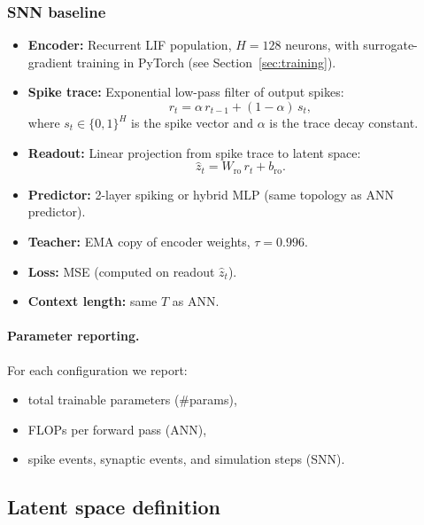 \documentclass[11pt,a4paper]{article}
\begin{document}
\subsubsection{SNN baseline}

\begin{itemize}[nosep]
\item \textbf{Encoder:} Recurrent LIF population, $H=128$ neurons,
  with surrogate-gradient training in PyTorch (see
  Section~\ref{sec:training}).
\item \textbf{Spike trace:} Exponential low-pass filter of output spikes:
  \begin{equation}\label{eq:spike-trace}
    r_t = \alpha\, r_{t-1} + (1-\alpha)\, s_t,
  \end{equation}
  where $s_t\in\{0,1\}^H$ is the spike vector and $\alpha$ is the
  trace decay constant.
\item \textbf{Readout:} Linear projection from spike trace to latent
  space:
  \begin{equation}\label{eq:readout}
    \hat{z}_t = W_{\text{ro}}\, r_t + b_{\text{ro}}.
  \end{equation}
\item \textbf{Predictor:} 2-layer spiking or hybrid MLP (same topology
  as ANN predictor).
\item \textbf{Teacher:} EMA copy of encoder weights, $\tau=0.996$.
\item \textbf{Loss:} MSE (computed on readout $\hat{z}_t$).
\item \textbf{Context length:} same $T$ as ANN.
\end{itemize}

\paragraph{Parameter reporting.}
For each configuration we report:
\begin{itemize}[nosep]
\item total trainable parameters (\#params),
\item FLOPs per forward pass (ANN),
\item spike events, synaptic events, and simulation steps (SNN).
\end{itemize}

\subsection{Latent space definition}\label{sec:latent-def}
\end{document}
